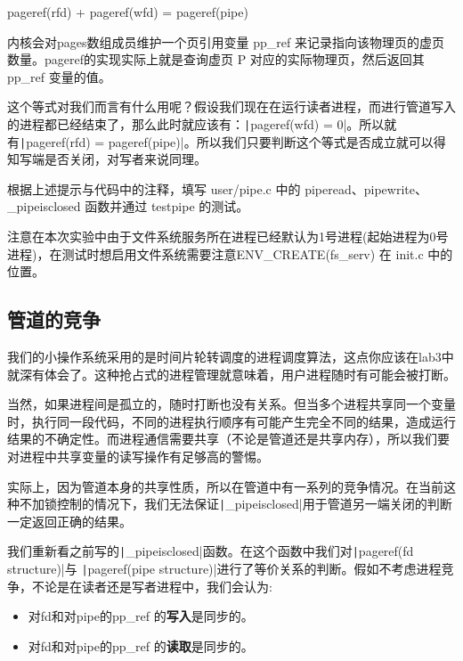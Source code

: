 pageref(rfd) + pageref(wfd) = pageref(pipe)\label{variant}

\begin{note}
内核会对pages数组成员维护一个页引用变量 pp\_ref 来记录指向该物理页的虚页数量。pageref的实现实际上就是查询虚页 P 对应的实际物理页，然后返回其 pp\_ref 变量的值。
\end{note}

这个等式对我们而言有什么用呢？假设我们现在在运行读者进程，而进行管道写入的进程都已经结束了，那么此时就应该有：\texttt|pageref(wfd) = 0|。所以就有\texttt|pageref(rfd) = pageref(pipe)|。所以我们只要判断这个等式是否成立就可以得知写端是否关闭，对写者来说同理。

\begin{exercise}
	根据上述提示与代码中的注释，填写 user/pipe.c 中的 piperead、pipewrite、\_pipeisclosed 函数并通过 testpipe 的测试。
\end{exercise}

\begin{note}
注意在本次实验中由于文件系统服务所在进程已经默认为1号进程(起始进程为0号进程)，在测试时想启用文件系统需要注意ENV\_CREATE(fs\_serv) 在 init.c 中的位置。
\end{note}

\subsection{管道的竞争}

我们的小操作系统采用的是时间片轮转调度的进程调度算法，这点你应该在lab3中就深有体会了。这种抢占式的进程管理就意味着，用户进程随时有可能会被打断。

当然，如果进程间是孤立的，随时打断也没有关系。但当多个进程共享同一个变量时，执行同一段代码，不同的进程执行顺序有可能产生完全不同的结果，造成运行结果的不确定性。而进程通信需要共享（不论是管道还是共享内存），所以我们要对进程中共享变量的读写操作有足够高的警惕。

实际上，因为管道本身的共享性质，所以在管道中有一系列的竞争情况。在当前这种不加锁控制的情况下，我们无法保证\texttt|_pipeisclosed|用于管道另一端关闭的判断一定返回正确的结果。

我们重新看之前写的\texttt|_pipeisclosed|函数。在这个函数中我们对\texttt|pageref(fd structure)|与 
\texttt|pageref(pipe structure)|进行了等价关系的判断。假如不考虑进程竞争，不论是在读者还是写者进程中，我们会认为:

\begin{itemize}
	\item 对fd和对pipe的pp\_ref 的\textbf{写入}是同步的。
	\item 对fd和对pipe的pp\_ref 的\textbf{读取}是同步的。 
\end{itemize}

